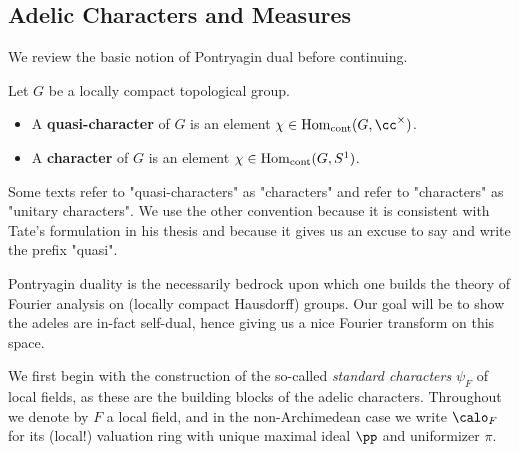 \documentclass[11pt, x11names, openany]{book}
\begin{document}
\subsection{Adelic Characters and Measures}
\label{subsection: Characters and Measures}

We review the basic notion of Pontryagin dual before continuing.

\begin{defn}
    \label{def: character and quasi-character}
Let $G$ be a locally compact topological group. 
\begin{itemize}
\item A \textbf{quasi-character} of $G$ is an element $\chi \in \Hom_{\mathrm{cont}}(G, \cc^\times)$.
\item A \textbf{character} of $G$ is an element $\chi \in \operatorname{Hom}_{\mathrm{cont}}(G, S^1)$.
\end{itemize}    
\end{defn}


\begin{remark}
    Some texts refer to "quasi-characters" as "characters" and refer to "characters" as "unitary characters". We use the other convention because it is consistent with Tate's formulation in his thesis \cite{TatesThesis} and because it gives us an excuse to say and write the prefix "quasi".
\end{remark}

Pontryagin duality is the necessarily bedrock upon which one builds the theory of Fourier analysis on (locally compact Hausdorff) groups. Our goal will be to show the adeles are in-fact self-dual, hence giving us a nice Fourier transform on this space.

We first begin with the construction of the so-called \textit{standard characters} $\psi_F$ of local fields, as these are the building blocks of the adelic characters. Throughout we denote by $F$ a local field, and in the non-Archimedean case we write $\calo_F$ for its (local!) valuation ring with unique maximal ideal $\pp$ and uniformizer $\pi$.
\end{document}
